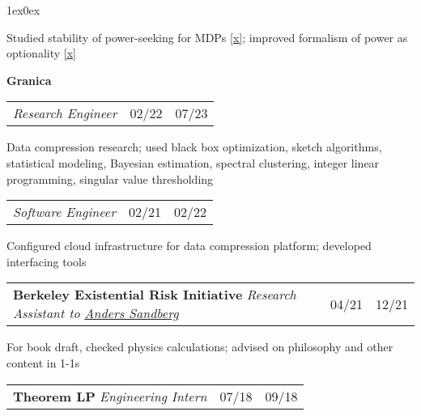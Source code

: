 \documentclass[12pt]{article}
\def\myh{20pt}
\def\indentlen{1ex}
\newcommand{\datecolor}{lavender3}
\let\oldbold\textbf
\renewcommand{\textbf}[1]{\oldbold{\color{boldpurple} #1}}
\let\olditalic\textit
\renewcommand{\textit}[1]{\olditalic{\color{lavender} #1}}
\newcommand{\mysmallerverticalspace}{\vspace{2pt}}
\newcommand{\datecolwidth}{29pt}
\newcommand{\titlecolwidth}{\textwidth - \datecolwidth*3 + \myh/2 - 5pt}
\begin{document}
{\begin{adjustwidth}{\indentlen}{0ex}
\color{normaltext}

Studied stability of power-seeking for MDPs \href{https://arxiv.org/abs/2401.03529}{[x]};
improved formalism of power as optionality \href{https://drive.google.com/file/d/1jyu0U2VYuy3Srrp7Sfs56xBDZUqNymQA/view?usp=drive_link}{[x]}

\mysmallerverticalspace

\textbf{\hspace{-\indentlen}Granica}

\color{\datecolor}

\begin{tabular}{@{}p{\titlecolwidth}r@{|}p{\datecolwidth}@{}}
\textit{Research Engineer} & 02/22 & 07/23
\end{tabular}

\color{normaltext}

Data compression research; used black box optimization, sketch algorithms, statistical modeling, Bayesian estimation,
spectral clustering,
integer linear programming,
singular value thresholding

\mysmallerverticalspace

\color{\datecolor}

\begin{tabular}{@{}p{\titlecolwidth}r@{|}p{\datecolwidth}@{}}
\textit{Software Engineer} & 02/21 & 02/22
\end{tabular}

\color{normaltext}

Configured cloud infrastructure for data compression platform; developed interfacing tools

\mysmallerverticalspace

\color{\datecolor}
\begin{tabular}{@{}p{\titlecolwidth}r@{|}p{\datecolwidth}@{}}
\textbf{\hspace{-\indentlen}Berkeley Existential Risk Initiative} \textit{Research Assistant to \href{https://www.ox.ac.uk/news-and-events/find-an-expert/dr-anders-sandberg}{Anders Sandberg}} & 04/21 & 12/21
\end{tabular}

\color{normaltext}

For book draft, checked physics calculations; advised on philosophy %
and other
content in 1-1s

\mysmallerverticalspace

\color{\datecolor}

\begin{tabular}{@{}p{\titlecolwidth}r@{|}p{\datecolwidth}@{}}
\textbf{\hspace{-\indentlen}Theorem LP} \hspace{\rolesep} \textit{Engineering Intern} & 07/18 & 09/18
\end{tabular}


\end{adjustwidth}}
\end{document}
